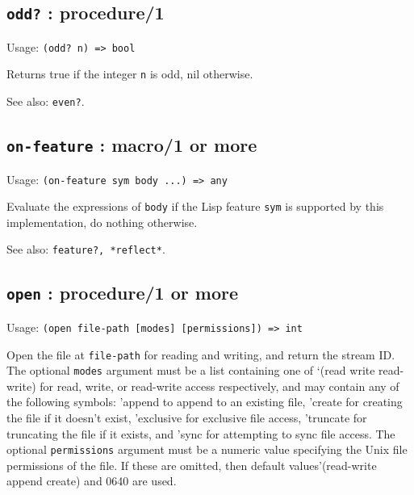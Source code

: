 \documentclass[
]{article}
\newcommand{\passthrough}[1]{#1}
\begin{document}
\hypertarget{odd-procedure1-1}{%
\subsection{\texorpdfstring{\texttt{odd?} :
procedure/1}{odd? : procedure/1}}\label{odd-procedure1-1}}

Usage: \passthrough{\lstinline!(odd? n) => bool!}

Returns true if the integer \passthrough{\lstinline!n!} is odd, nil
otherwise.

See also: \passthrough{\lstinline!even?!}.

\hypertarget{on-feature-macro1-or-more-1}{%
\subsection{\texorpdfstring{\texttt{on-feature} : macro/1 or
more}{on-feature : macro/1 or more}}\label{on-feature-macro1-or-more-1}}

Usage: \passthrough{\lstinline!(on-feature sym body ...) => any!}

Evaluate the expressions of \passthrough{\lstinline!body!} if the Lisp
feature \passthrough{\lstinline!sym!} is supported by this
implementation, do nothing otherwise.

See also: \passthrough{\lstinline!feature?, *reflect*!}.

\hypertarget{open-procedure1-or-more-1}{%
\subsection{\texorpdfstring{\texttt{open} : procedure/1 or
more}{open : procedure/1 or more}}\label{open-procedure1-or-more-1}}

Usage:
\passthrough{\lstinline!(open file-path [modes] [permissions]) => int!}

Open the file at \passthrough{\lstinline!file-path!} for reading and
writing, and return the stream ID. The optional
\passthrough{\lstinline!modes!} argument must be a list containing one
of `(read write read-write) for read, write, or read-write access
respectively, and may contain any of the following symbols: 'append to
append to an existing file, 'create for creating the file if it doesn't
exist, 'exclusive for exclusive file access, 'truncate for truncating
the file if it exists, and 'sync for attempting to sync file access. The
optional \passthrough{\lstinline!permissions!} argument must be a
numeric value specifying the Unix file permissions of the file. If these
are omitted, then default values'(read-write append create) and 0640 are
used.
\end{document}
